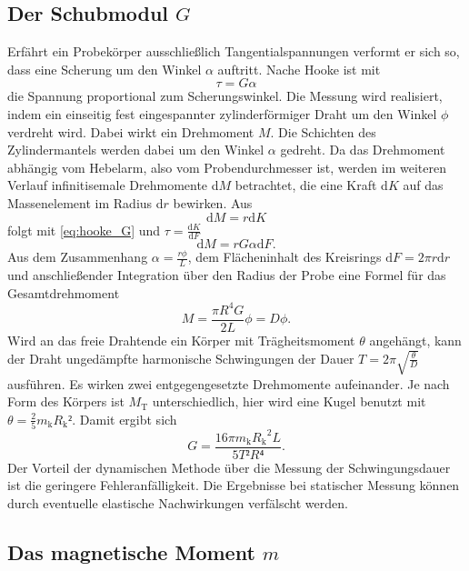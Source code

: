 \subsection{Der Schubmodul \texorpdfstring{$G$}{G}}
Erfährt ein Probekörper ausschließlich Tangentialspannungen verformt er sich so, dass eine Scherung um den Winkel $\alpha$ auftritt. Nache Hooke ist mit
\begin{equation}
\tau=G\alpha
\label{eq:hooke_G}
\end{equation}
 die Spannung proportional zum Scherungswinkel. 
Die Messung wird realisiert, indem ein einseitig fest eingespannter zylinderförmiger Draht um den Winkel $\phi$ verdreht wird. Dabei wirkt ein Drehmoment $M$. Die Schichten des Zylindermantels werden dabei um den Winkel $\alpha$ gedreht. 
Da das Drehmoment abhängig vom Hebelarm, also vom Probendurchmesser ist, werden im weiteren Verlauf infinitisemale Drehmomente d$M$ betrachtet, die eine Kraft d$K$ auf das Massenelement im Radius d$r$ bewirken.
Aus
\begin{equation}
\mathup{d}M=r\mathup{d}K
\end{equation}
folgt mit \eqref{eq:hooke_G} und $\tau=\frac{\mathup{d}K}{\mathup{d}F}$
\begin{equation}
\mathup{d}M=rG\alpha\mathup{d}F.
\end{equation}
Aus dem Zusammenhang $\alpha=\frac{r\phi}{L}$, dem Flächeninhalt des Kreisrings $\mathup{d}F=2\pi r\mathup{d}r$ und anschließender Integration über den Radius der Probe eine Formel für das Gesamtdrehmoment
\begin{equation}
M=\frac{\pi R^4 G}{2L}\phi=D\phi.
\label{eq:Richtgrosse}
\end{equation}
Wird an das freie Drahtende ein Körper mit Trägheitsmoment $\theta$ angehängt, kann der Draht ungedämpfte harmonische Schwingungen der Dauer $T=2\pi\sqrt{\frac{\theta}{D}}$ ausführen. Es wirken zwei entgegengesetzte Drehmomente aufeinander. Je nach Form des Körpers ist $M_\mathup{T}$ unterschiedlich, hier wird eine Kugel benutzt mit $\theta=\frac{2}{5}m_\mathup{k}{R_\mathup{k}}²$. Damit ergibt sich 
\begin{equation}
G=\frac{16\pi m_\mathup{k} {R_\mathup{k}}^2 L}{5T²R⁴}.
\label{eq:G}
\end{equation}
Der Vorteil der dynamischen Methode über die Messung der Schwingungsdauer ist die geringere Fehleranfälligkeit. Die Ergebnisse bei statischer Messung können durch eventuelle elastische Nachwirkungen verfälscht werden.

\subsection{Das magnetische Moment \texorpdfstring{$m$}{m}}

